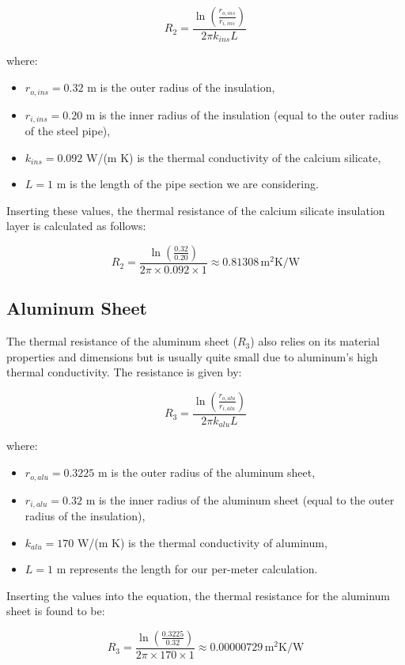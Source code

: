 \documentclass{article}
\begin{document}
\[
R_2 = \frac{\ln(\frac{r_{o,ins}}{r_{i,ins}})}{2 \pi k_{ins} L}
\]

where:
\begin{itemize}
    \item \(r_{o,ins} = 0.32\) m is the outer radius of the insulation,
    \item \(r_{i,ins} = 0.20\) m is the inner radius of the insulation (equal to the outer radius of the steel pipe),
    \item \(k_{ins} = 0.092\) W/(m K) is the thermal conductivity of the calcium silicate,
    \item \(L = 1\) m is the length of the pipe section we are considering.
\end{itemize}

Inserting these values, the thermal resistance of the calcium silicate insulation layer is calculated as follows:

\[
R_2 = \frac{\ln(\frac{0.32}{0.20})}{2 \pi \times 0.092 \times 1} \approx 0.81308 \, \text{m}^2\text{K/W}
\]

\subsection*{Aluminum Sheet}
The thermal resistance of the aluminum sheet (\(R_3\)) also relies on its material properties and dimensions but is usually quite small due to aluminum's high thermal conductivity. The resistance is given by:

\[
R_3 = \frac{\ln(\frac{r_{o,alu}}{r_{i,alu}})}{2 \pi k_{alu} L}
\]

where:
\begin{itemize}
    \item \(r_{o,alu} = 0.3225\) m is the outer radius of the aluminum sheet,
    \item \(r_{i,alu} = 0.32\) m is the inner radius of the aluminum sheet (equal to the outer radius of the insulation),
    \item \(k_{alu} = 170\) W/(m K) is the thermal conductivity of aluminum,
    \item \(L = 1\) m represents the length for our per-meter calculation.
\end{itemize}

Inserting the values into the equation, the thermal resistance for the aluminum sheet is found to be:

\[
R_3 = \frac{\ln(\frac{0.3225}{0.32})}{2 \pi \times 170 \times 1} \approx 0.00000729 \, \text{m}^2\text{K/W}
\]
\end{document}
